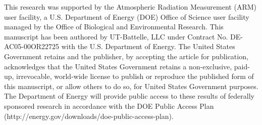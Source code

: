 This research was supported by the Atmospheric Radiation Measurement (ARM) user 
facility, a U.S. Department of Energy (DOE) Office of Science user facility 
managed by the Office of Biological and Environmental Research.
This manuscript has been authored by UT-Battelle, LLC under Contract No. DE-AC05-00OR22725 with
the U.S. Department of Energy. The United States Government retains and 
the publisher, by accepting the article for publication, acknowledges 
that the United States Government retains a non-exclusive, paid- up, 
irrevocable, world-wide license to publish or reproduce the published 
form of this manuscript, or allow others to do so, for United States 
Government purposes. The Department of Energy will provide public access 
to these results of federally sponsored research in accordance with the 
DOE Public Access Plan (http://energy.gov/downloads/doe-public-access-plan).
